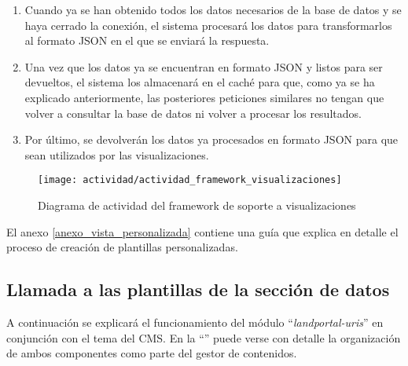 \begin{enumerate}
\begin{enumerate}
		\end{enumerate}
	\item  Cuando ya se han obtenido todos los datos necesarios de la base de datos y se haya cerrado la conexión, el sistema procesará los datos para transformarlos al formato JSON en el que se enviará la respuesta.
	\item  Una vez que los datos ya se encuentran en formato JSON y listos para ser devueltos, el sistema los almacenará en el caché para que, como ya se ha explicado anteriormente, las posteriores peticiones similares no tengan que volver a consultar la base de datos ni volver a procesar los resultados.
	\item  Por último, se devolverán los datos ya procesados en formato JSON para que sean utilizados por las visualizaciones.
\end{enumerate}
\begin{figure}[h]
	\centering
	\texttt{[image: actividad/actividad\_framework\_visualizaciones]}
	\caption{Diagrama de actividad del framework de soporte a visualizaciones}
	\label{fig:diagrama_actividad_framework_soporte_visualizaciones}
\end{figure}

El anexo \ref{anexo_vista_personalizada} contiene una guía que explica en detalle el proceso de creación de plantillas personalizadas.

\subsection{Llamada a las plantillas de la sección de datos}
\label{actividad:landportal-uris_theme}
A continuación se explicará el funcionamiento del módulo ``\textit{landportal-uris}'' en conjunción con el tema del CMS.  En la ``'' puede verse con detalle la organización de ambos componentes como parte del gestor de contenidos.


